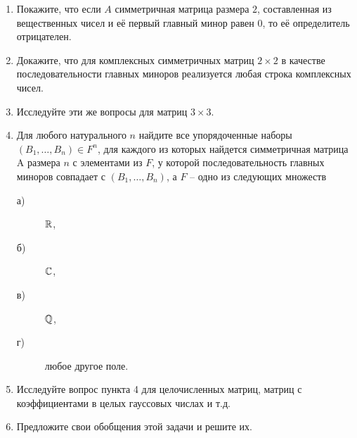 \begin{enumerate}
\item Покажите, что если $A$ симметричная матрица размера $2$, составленная из вещественных чисел и её первый главный минор равен $0$, то её определитель отрицателен.
\item Докажите, что для комплексных симметричных матриц $2\times 2$ в качестве последовательности главных миноров реализуется любая строка комплексных чисел.
\item Исследуйте эти же вопросы для матриц $3\times 3$.
\item \label{targ} Для любого натурального $n$ найдите все упорядоченные наборы $(B_1, \dots , B_n ) \in F^n$, для каждого из которых найдется симметричная матрица A размера $n$ с элементами из $F$, у которой последовательность главных миноров совпадает с $(B_1, \dots , B_n )$, а $F$ – одно из следующих множеств
\begin{description}
\item[а) ] $\mathbb{R}$,
\item[б) ] $\mathbb{C}$,
\item[в) ] $\mathbb{Q}$,
\item[г) ] любое другое поле.
\end{description}
\item Исследуйте вопрос пункта 4 для целочисленных матриц, матриц с коэффициентами в целых гауссовых числах и т.д.
\item Предложите свои обобщения этой задачи и решите их.
\end{enumerate}





